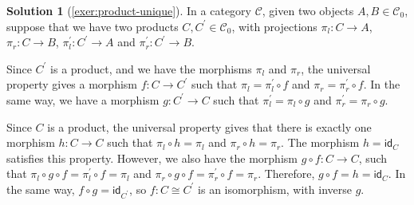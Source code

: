 \documentclass[a4paper,11pt, oneside,titlepage=false]{scrbook}
\theoremstyle{plain}
\theoremstyle{definition}
\newtheorem{solution}[thm]{Solution}
\newcommand{\cfont}[1]{\ensuremath{\mathsf{#1}}}
\newcommand{\Cat}[1]{\mathcal{#1}}
\newcommand{\CC}{\Cat{C}}
\newcommand{\Ob}[1]{{#1}_0}
\newcommand{\Id}[1][]{\cfont{id}_{#1}}
\newcommand{\projl}{\ensuremath{\pi_l}}
\newcommand{\projr}{\ensuremath{\pi_r}}
\begin{document}
\begin{solution}[\cref{exer:product-unique}]\label{sol:product-unique}
	In a category $ \CC $, given two objects $ A, B \in \Ob \CC $, suppose that we have two products $ C, C^\prime \in \Ob \CC $, with projections $ \projl: C \to A $, $ \projr: C \to B $, $ \pi^\prime_l: C^\prime \to A $ and $ \pi^\prime_r: C^\prime \to B $.

	Since $ C^\prime $ is a product, and we have the morphisms $ \projl $ and $ \projr $, the universal property gives a morphism $ f: C \to C^\prime $ such that $ \projl = \pi^\prime_l \circ f $ and $ \projr = \pi^\prime_r \circ f $. In the same way, we have a morphism $ g: C^\prime \to C $ such that $ \pi^\prime_l = \projl \circ g $ and $ \pi^\prime_r = \projr \circ g $.

	Since $ C $ is a product, the universal property gives that there is exactly one morphism $ h: C \to C $ such that $ \projl \circ h = \projl $ and $ \projr \circ h = \projr $. The morphism $ h = \Id[C] $ satisfies this property. However, we also have the morphism $ g \circ f: C \to C $, such that $ \projl \circ g \circ f = \pi^\prime_l \circ f = \projl $ and $ \projr \circ g \circ f = \pi^\prime_r \circ f = \projr $. Therefore, $ g \circ f = h = \Id[C] $. In the same way, $ f \circ g = \Id[C^\prime] $, so $ f: C \cong C^\prime $ is an isomorphism, with inverse $ g $.
\end{solution}
\end{document}
